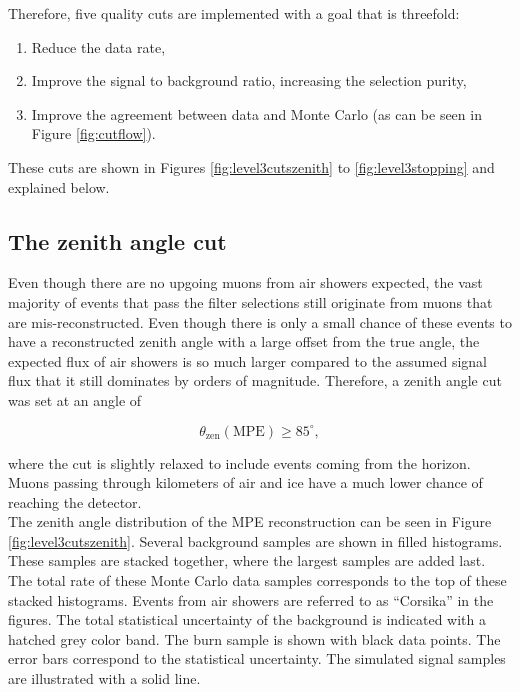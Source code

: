 Therefore, five quality cuts are implemented with a goal that is threefold:
\vspace{2mm}
\begin{enumerate}
\item Reduce the data rate,
\item Improve the signal to background ratio, increasing the selection purity,
\item Improve the agreement between data and Monte Carlo (as can be seen in Figure \ref{fig:cutflow}).
\end{enumerate}
\vspace{2mm}
\noindent These cuts are shown in Figures \ref{fig:level3cutszenith} to \ref{fig:level3stopping} and explained below.


\subsection{The zenith angle cut}
\label{subsec:zenithanglecut}
Even though there are no upgoing muons from air showers expected, the vast majority of events that pass the filter selections still originate from muons that are mis-reconstructed. Even though there is only a small chance of these events to have a reconstructed zenith angle with a large offset from the true angle, the expected flux of air showers is so much larger compared to the assumed signal flux that it still dominates by orders of magnitude. Therefore, a zenith angle cut was set at an angle of 

\begin{equation}
\theta_\textrm{zen} (\textrm{MPE}) \geq 85^\circ,
\end{equation}

\noindent where the cut is slightly relaxed to include events coming from the horizon. Muons passing through kilometers of air and ice have a much lower chance of reaching the detector.\\

\noindent The zenith angle distribution of the MPE reconstruction can be seen in Figure \ref{fig:level3cutszenith}. Several background samples are shown in filled histograms. These samples are stacked together, where the largest samples are added last. The total rate of these Monte Carlo data samples corresponds to the top of these stacked histograms. Events from air showers are referred to as ``Corsika'' in the figures. The total statistical uncertainty of the background is indicated with a hatched grey color band. The burn sample is shown with black data points. The error bars correspond to the statistical uncertainty. The simulated signal samples are illustrated with a solid line.

